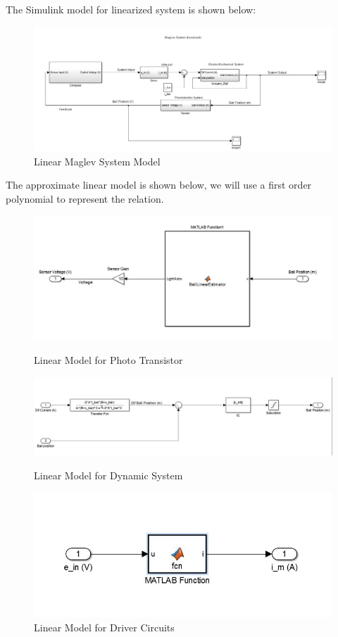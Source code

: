 \documentclass[letterpaper]{article}
\begin{document}
The Simulink model for linearized system is shown below:
\begin{figure}[H]
	\centering
	\includegraphics[scale=0.36]{Maglev system(linear).jpg}
	\caption{Linear Maglev System Model}
\end{figure}
The approximate linear model is shown below, we will use a first order polynomial to represent the relation.
\begin{figure}[H]
	\centering
	\includegraphics[scale=0.36]{sensor.jpg}
	\caption{Linear Model for Photo Transistor}
	\centering
	\includegraphics[scale=0.36]{Actuator_Ball.jpg}
	\caption{Linear Model for Dynamic System}
	\centering
	\includegraphics[scale=0.5]{Driver.jpg}
	\caption{Linear Model for Driver Circuits}
\end{figure}
\end{document}
